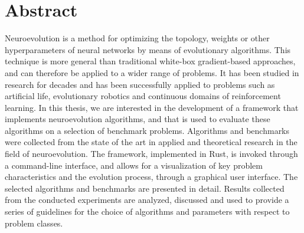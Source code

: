 \section*{Abstract}

Neuroevolution is a method for optimizing the topology, weights or other hyperparameters of neural networks by means of evolutionary algorithms.
This technique is more general than traditional white-box gradient-based approaches, and can therefore be applied to a wider range of
problems. It has been studied in research for decades and has been successfully applied to problems such as artificial life,
evolutionary robotics and continuous domains of reinforcement learning.
In this thesis, we are interested in the development of a framework that implements neuroevolution algorithms, and that is used to evaluate these algorithms on a
selection of benchmark problems. Algorithms and benchmarks were collected from the state of the art in applied and theoretical research in
the field of neuroevolution. The framework, implemented in Rust, is invoked through a command-line interface, and allows for a visualization of key problem
characteristics and the evolution process, through a graphical user interface. The selected algorithms and benchmarks are presented in detail. Results collected
from the conducted experiments are analyzed, discussed and used to provide a series of guidelines for the choice of algorithms and parameters with respect
to problem classes.

